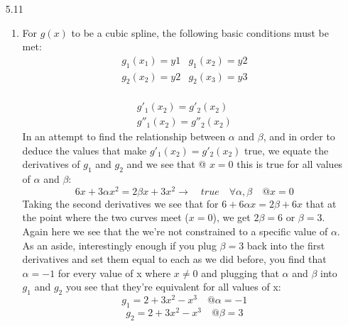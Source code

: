\documentclass[11pt,a4paper]{article}
\begin{document}
\begin{itemize}
\begin{enumerate} [label={\alph*)}]
					\item From Theorem 5.5 we follow the same logic for $\vert \vert f'''' \vert \vert_\infty$ and the error statement thus reads $\vert f(x)-s(x) \vert \leq \frac{5}{384}h^4 \leq 10e-06$, solving for $h$ we see:
					$$h = \sqrt[4]{\frac{384*10e-06}{5}}$$
					$$n \geq \frac{10}{\sqrt[4]{\frac{384*10e-06}{5}}} + 1$$
					$$n \geq 6.107029e+01$$
					\item From Theorem 5.8 we have $\vert f(x) - p_n(x) \vert \leq \frac{1}{2^n(n+1)!}(\frac{b-a}{2})^{n+1}\vert \vert f^{n+1} \vert \vert_\infty$. Using the same logic as before we deduce $\vert \vert f^{n+1} \vert \vert_\infty = 1$ and solving for $n$ we see:
					$$ \frac{1}{2^n(n+1)!}(\frac{10}{2})^{n+1} \leq 10e-06 $$
					Using Matlab to solve for $n$, we see that this equality holds when $n \geq 13$
					\item Because the Bessel function for higher orders follows the same logic as for lower orders, and because the new variable introduced is with respect to the differentiation variable $ds$, we know that when we integrate it will go away, and so there is no change from the argument introduced in part a, and our answers don't change for parts b through d.
				\end{enumerate}
					
			\item[5.11]
				\begin{enumerate} [label={\alph*)}]
					\item For $g(x)$ to be a cubic spline, the following basic conditions must be met:
					$$\begin{array}{cc}
						g_1(x_1)=y1 & g_1(x_2)=y2 \\
						g_2(x_2)=y2 & g_2(x_3)=y3 
					\end{array}$$~
					$$\begin{array}{c}
						g'_1(x_2)=g'_2(x_2)\\
						g''_1(x_2)=g''_2(x_2)
					\end{array}$$
					In an attempt to find the relationship between $\alpha$ and $\beta$, and in order to deduce the values that make $g'_1(x_2)=g'_2(x_2)$ true, we equate the derivatives of $g_1$ and $g_2$ and we see that @ $x=0$ this is true for all values of $\alpha$ and $\beta$:
					$$6x+3\alpha x^2=2 \beta x + 3x^2 \rightarrow \quad true \quad \forall \alpha,\beta \quad @x=0$$
					Taking the second derivatives we see that for $6+6\alpha x = 2 \beta + 6x$ that at the point where the two curves meet ($x=0$), we get $2\beta = 6$ or $\beta = 3$. Again here we see that the we're not constrained to a specific value of $\alpha$. As an aside, interestingly enough if you plug $\beta = 3$ back into the first derivatives and set them equal to each as we did before, you find that $\alpha = -1$ for every value of x where $x\neq0$ and plugging that $\alpha$ and $\beta$ into $g_1$ and $g_2$ you see that they're equivalent for all values of x:
					$$g_1 = 2+3x^2 -x^3 \quad @\alpha=-1$$
					$$g_2 = 2+3x^2 -x^3 \quad @\beta=3$$
					

\end{enumerate}
\end{itemize}
\end{document}
